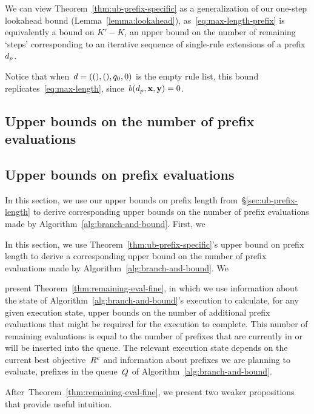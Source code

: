 We can view Theorem~\ref{thm:ub-prefix-specific} as a generalization
of our one-step lookahead bound (Lemma~\ref{lemma:lookahead}),
as~\eqref{eq:max-length-prefix} is equivalently a bound on ${K' - K}$,
an upper bound on the number of remaining `steps' corresponding to
an iterative sequence of single-rule extensions of a prefix~$d_p$.
%
\begin{arxiv}
Notice that when~${{d} = ((), (), q_0, 0)}$ is the empty rule list,
this bound replicates~\eqref{eq:max-length}, since~${b(d_p, \mathbf{x}, \mathbf{y}) = 0}$.
\end{arxiv}

\begin{arxiv}
\subsection{Upper bounds on the number of prefix evaluations}
\end{arxiv}
\begin{kdd}
\subsection{Upper bounds on prefix evaluations}
\end{kdd}
\label{sec:ub-size}

\begin{arxiv}
In this section, we use our upper bounds on prefix length
from~\S\ref{sec:ub-prefix-length} to derive corresponding
upper bounds on the number of prefix evaluations made by
Algorithm~\ref{alg:branch-and-bound}.
%
First, we
\end{arxiv}
\begin{kdd}
In this section, we use Theorem~\ref{thm:ub-prefix-specific}'s
upper bound on prefix length to derive a corresponding
upper bound on the number of prefix evaluations made by
Algorithm~\ref{alg:branch-and-bound}.
%
We
\end{kdd}
present Theorem~\ref{thm:remaining-eval-fine},
in which we use information about the state of
Algorithm~\ref{alg:branch-and-bound}'s execution
to calculate, for any given execution state,
upper bounds on the number of additional prefix evaluations that might
be required for the execution to complete.
%
This number of remaining evaluations is equal to the number of
prefixes that are currently in or will be inserted into the queue.
%
The relevant execution state depends on the current
best objective~${R^c}$ and information about
prefixes we are planning to evaluate, \ie prefixes in the
queue~$Q$ of Algorithm~\ref{alg:branch-and-bound}.
%
\begin{arxiv}
After~Theorem~\ref{thm:remaining-eval-fine}, we present two
weaker propositions that provide useful intuition.
\end{arxiv}

